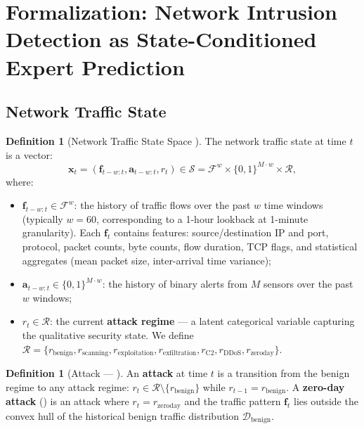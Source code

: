 \documentclass[11pt,a4paper]{article}
\theoremstyle{definition}
\newtheorem{definition}[theorem]{Definition}
\theoremstyle{remark}
\newcommand{\cD}{\mathcal{D}}
\newcommand{\cF}{\mathcal{F}}
\newcommand{\cS}{\mathcal{S}}
\newcommand{\sensorstate}{\mathbf{x}}
\newcommand{\alertvec}{\mathbf{a}}
\newcommand{\flowvec}{\mathbf{f}}
\begin{document}
\section{Formalization: Network Intrusion Detection as State-Conditioned Expert Prediction }
\label{sec:formalization}

\subsection{Network Traffic State }

\begin{definition}[Network Traffic State Space ]
\label{def:state}
The network traffic state at time $t$ is a vector:
\begin{equation}
\sensorstate_t = (\flowvec_{t-w:t}, \alertvec_{t-w:t}, r_t) \in \cS = \cF^{w} \times \{0, 1\}^{M \cdot w} \times \mathcal{R},
\label{eq:state}
\end{equation}
where:
\begin{itemize}[nosep]
    \item $\flowvec_{t-w:t} \in \cF^{w}$: the history of traffic flows over the past $w$ time windows (typically $w = 60$, corresponding to a 1-hour lookback at 1-minute granularity). Each $\flowvec_t$ contains features: source/destination IP and port, protocol, packet counts, byte counts, flow duration, TCP flags, and statistical aggregates (mean packet size, inter-arrival time variance);
    \item $\alertvec_{t-w:t} \in \{0, 1\}^{M \cdot w}$: the history of binary alerts from $M$ sensors over the past $w$ windows;
    \item $r_t \in \mathcal{R}$: the current \textbf{attack regime} — a latent categorical variable capturing the qualitative security state. We define $\mathcal{R} = \{r_{\mathrm{benign}}, r_{\mathrm{scanning}}, r_{\mathrm{exploitation}}, r_{\mathrm{exfiltration}}, r_{\mathrm{C2}}, r_{\mathrm{DDoS}}, r_{\mathrm{zeroday}}\}$.
\end{itemize}
\end{definition}

\begin{definition}[Attack — ]
\label{def:attack}
An \textbf{attack} at time $t$ is a transition from the benign regime to any attack regime: $r_t \in \mathcal{R} \setminus \{r_{\mathrm{benign}}\}$ while $r_{t-1} = r_{\mathrm{benign}}$. A \textbf{zero-day attack} () is an attack where $r_t = r_{\mathrm{zeroday}}$ and the traffic pattern $\flowvec_t$ lies outside the convex hull of the historical benign traffic distribution $\cD_{\mathrm{benign}}$.
\end{definition}
\end{document}
